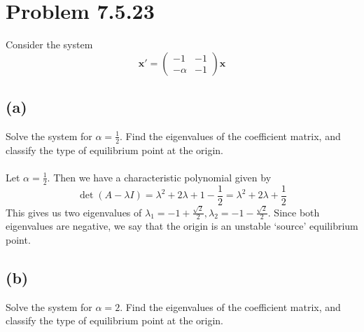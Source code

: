 \documentclass{article}
\theoremstyle{definition}
\begin{document}
\section*{Problem 7.5.23}
    \begin{mdframed}[]
        Consider the system
        \[
            \bm x' =
            \begin{pmatrix}
                -1 & -1 \\
                -\alpha & -1
            \end{pmatrix}
            \bm x
        \]
    \end{mdframed}
    \subsection*{(a)}
        Solve the system for $\alpha = \frac{1}{2}$. Find the eigenvalues of the coefficient matrix, and classify the 
        type of equilibrium point at the origin.\\\\
        Let $\alpha = \frac{1}{2}$. Then we have a characteristic polynomial given by 
        \[
            \det (A - \lambda I) = \lambda^2 + 2 \lambda + 1 - \frac{1}{2} = \lambda^2 + 2 \lambda + \frac{1}{2}
        \]
        This gives us two eigenvalues of $\lambda_1 = -1 + \frac{\sqrt{2}}{2}, \lambda_2 = -1 - \frac{\sqrt{2}}{2}$. Since both eigenvalues 
        are negative, we say that the origin is an unstable `source' equilibrium point.
    \subsection*{(b)}
        Solve the system for $\alpha = 2$. Find the eigenvalues of the coefficient matrix, and classify the type of equilibrium point at the origin.\\\\
        
\end{document}
